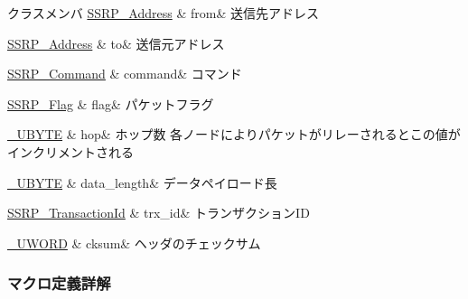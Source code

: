 \begin{DoxyFields}{クラスメンバ}
\hyperlink{ssrp_8h_af52db94d5ce59044edabda26c25f92f9_af52db94d5ce59044edabda26c25f92f9}{S\+S\+R\+P\+\_\+\+Address}\label{ssrp_8h_ab6d438068098a3360e18358de2a8f214}
&
from&
送信先アドレス \\
\hline

\hyperlink{ssrp_8h_af52db94d5ce59044edabda26c25f92f9_af52db94d5ce59044edabda26c25f92f9}{S\+S\+R\+P\+\_\+\+Address}\label{ssrp_8h_ae55a21f95cf8ef17c8577c3b24b2d0ef}
&
to&
送信元アドレス \\
\hline

\hyperlink{ssrp_8h_a90e773bf16f83fcbc70733b85f7ae614_a90e773bf16f83fcbc70733b85f7ae614}{S\+S\+R\+P\+\_\+\+Command}\label{ssrp_8h_a8d747d8673927a7aa0e2612906d07379}
&
command&
コマンド \\
\hline

\hyperlink{ssrp_8h_a1f7d2b0dad1935ce49334c86a67d202a_a1f7d2b0dad1935ce49334c86a67d202a}{S\+S\+R\+P\+\_\+\+Flag}\label{ssrp_8h_a23f63d32ab94ce5892b4d130188fc2be}
&
flag&
パケットフラグ \\
\hline

\hyperlink{stddef_8h_aac464b47452ce9406f88ef194e2becc1_aac464b47452ce9406f88ef194e2becc1}{\+\_\+\+U\+B\+Y\+T\+E}\label{ssrp_8h_ab58e808b1f76daa8a32677ad10cae063}
&
hop&
ホップ数 各ノードによりパケットがリレーされるとこの値がインクリメントされる \\
\hline

\hyperlink{stddef_8h_aac464b47452ce9406f88ef194e2becc1_aac464b47452ce9406f88ef194e2becc1}{\+\_\+\+U\+B\+Y\+T\+E}\label{ssrp_8h_a3bbf1bebce268c4213b7e38ad393640e}
&
data\+\_\+length&
データペイロード長 \\
\hline

\hyperlink{ssrp_8h_a4ffad5beeb1efa21afe8cd4070a9bdf8_a4ffad5beeb1efa21afe8cd4070a9bdf8}{S\+S\+R\+P\+\_\+\+Transaction\+Id}\label{ssrp_8h_adc8bbb3f5c854347348dcc13750f94e5}
&
trx\+\_\+id&
トランザクション\+I\+D \\
\hline

\hyperlink{stddef_8h_af4b45f5ec97da370bd2173b4fe891d76_af4b45f5ec97da370bd2173b4fe891d76}{\+\_\+\+U\+W\+O\+R\+D}\label{ssrp_8h_a780386321e49bdafc39eb50f3a97d8a4}
&
cksum&
ヘッダのチェックサム \\
\hline

\end{DoxyFields}


\subsubsection{マクロ定義詳解}
